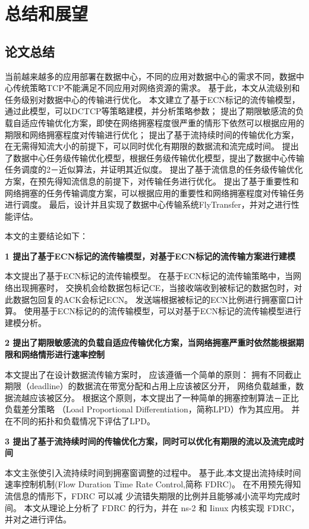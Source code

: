 \chapter{总结和展望} \label{cha:conclusion}
\section{论文总结}
当前越来越多的应用部署在数据中心，不同的应用对数据中心的需求不同，数据中心传统策略TCP不能满足不同应用对网络资源的需求。
基于此，本文从流级别和任务级别对数据中心的传输进行优化。
本文建立了基于ECN标记的流传输模型，通过此模型，可以DCTCP等策略建模，并分析策略参数；
提出了期限敏感流的负载自适应传输优化方案，即使在网络拥塞程度很严重的情形下依然可以根据应用的期限和网络拥塞程度对传输进行优化；
提出了基于流持续时间的传输优化方案，在无需得知流大小的前提下，可以同时优化有期限的数据流和流完成时间。
提出了数据中心任务级传输优化模型，根据任务级传输优化模型，提出了数据中心传输任务调度的2－近似算法，并证明其近似度。
提出了基于流信息的任务级传输优化方案，在预先得知流信息的前提下，对传输任务进行优化。
提出了基于重要性和网络拥塞的任务传输调度方案，可以根据应用的重要性和网络拥塞程度对传输任务进行调度。
最后，设计并且实现了数据中心传输系统FlyTransfer，并对之进行性能评估。

本文的主要结论如下：

\textbf{1 提出了基于ECN标记的流传输模型，对基于ECN标记的流传输方案进行建模}

本文提出了基于ECN标记的流传输模型。
在基于ECN标记的流传输策略中，当网络出现拥塞时，
交换机会给数据包标记CE，当接收端收到被标记的数据包时，对此数据包回复的ACK会标记ECN。
发送端根据被标记的ECN比例进行拥塞窗口计算。
使用基于ECN标记的的流传输模型，可以对基于ECN标记的流传输模型进行建模分析。



\textbf{2 提出了期限敏感流的负载自适应传输优化方案，当网络拥塞严重时依然能根据期限和网络情形进行速率控制}

本文提出了在设计数据流传输方案时，
应该遵循一个简单的原则：
拥有不同截止期限（deadline）的数据流在带宽分配和占用上应该被区分开，
网络负载越重，数据流越应该被区分。
根据这个原则，本文提出了一种简单的拥塞控制算法－正比负载差分策略
（Load Proportional Differentiation，简称LPD）作为其应用。
并在不同的拓扑和负载情况下评估了LPD。


\textbf{3 提出了基于流持续时间的传输优化方案，同时可以优化有期限的流以及流完成时间}

本文主张使引入流持续时间到拥塞窗调整的过程中。
基于此,本文提出流持续时间速率控制机制(Flow Duration Time Rate Control,简称 FDRC)。
在不用预先得知流信息的情形下，FDRC 可以减 少流错失期限的比例并且能够减小流平均完成时间。
本文从理论上分析了 FDRC 的行为，并在 ns-2 和 Iinux 内核实现 FDRC，并对之进行评估。



